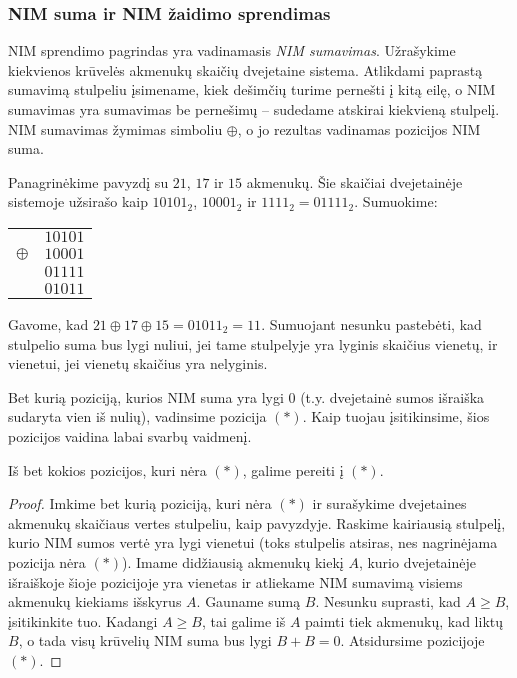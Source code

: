 \subsubsection{NIM suma ir NIM žaidimo sprendimas}

NIM sprendimo pagrindas yra vadinamasis \emph{NIM sumavimas}. Užrašykime
kiekvienos krūvelės akmenukų skaičių dvejetaine sistema. Atlikdami paprastą
sumavimą stulpeliu įsimename, kiek dešimčių turime pernešti į kitą eilę, o
NIM sumavimas yra sumavimas be pernešimų -- sudedame atskirai kiekvieną
stulpelį. NIM sumavimas žymimas simboliu $\oplus$, o jo rezultas vadinamas
pozicijos NIM suma.

Panagrinėkime pavyzdį su $21$, $17$ ir $15$ akmenukų. Šie skaičiai
dvejetainėje sistemoje užsirašo kaip $10101_2$, $10001_2$ ir $1111_2 =
01111_2$. Sumuokime:

\begin{center}
  \begin{tabular}[c]{r c}
    & $10101$ \\
    $\oplus$ & $10001$ \\
    & $01111$ \\ \hline
    & $01011$
  \end{tabular}
\end{center}

Gavome, kad $21 \oplus 17 \oplus 15=01011_2 = 11$. Sumuojant nesunku
pastebėti, kad stulpelio suma bus lygi nuliui, jei tame stulpelyje yra
lyginis skaičius vienetų, ir vienetui, jei vienetų skaičius yra nelyginis. 

Bet kurią poziciją, kurios NIM suma yra lygi $0$ (t.y. dvejetainė sumos išraiška
sudaryta vien iš nulių), vadinsime pozicija $(*)$. Kaip tuojau įsitikinsime,
šios pozicijos vaidina labai svarbų vaidmenį.

\begin{teig}
  Iš bet kokios pozicijos, kuri nėra $(*)$, galime pereiti į $(*)$.
\end{teig}

\begin{proof}
  Imkime bet kurią poziciją, kuri nėra $(*)$ ir surašykime dvejetaines
  akmenukų skaičiaus vertes stulpeliu, kaip pavyzdyje. Raskime kairiausią
  stulpelį, kurio NIM sumos vertė yra lygi vienetui (toks stulpelis atsiras,
  nes nagrinėjama pozicija nėra $(*)$). Imame didžiausią akmenukų kiekį $A$,
  kurio dvejetainėje išraiškoje šioje pozicijoje yra vienetas ir atliekame
  NIM sumavimą visiems akmenukų kiekiams išskyrus $A$.  Gauname sumą $B$.
  Nesunku suprasti, kad $A\geq B$, įsitikinkite tuo. Kadangi $A\geq B$, tai
  galime iš $A$ paimti tiek akmenukų, kad liktų $B$, o tada visų krūvelių
  NIM suma bus lygi $B+B=0$. Atsidursime pozicijoje $(*)$.
\end{proof}

